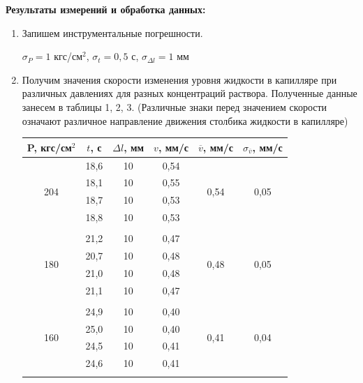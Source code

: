 \documentclass[a4paper, 12pt]{article}%
\begin{document}
	
    \textbf{Результаты измерений и обработка данных: }
	
	\begin{enumerate}
		\item Запишем инструментальные погрешности.
		
		$\sigma_P = 1$ кгс/см$^2$, 
		$\sigma_t = 0,5$ с, 
		$\sigma_{\Delta l} = 1$ мм
		
		\item  Получим значения скорости изменения уровня жидкости в капилляре при различных давлениях для разных концентраций раствора. Полученные данные занесем в таблицы 1, 2, 3. (Различные знаки перед значением скорости означают различное направление движения столбика жидкости в капилляре)
	\newpage
		\begin{longtable} {|c|c|c|c|c|c|}
		\hline
		P, кгс/см$^2$ & $ t $, с &   $ \Delta l$, мм  & $v$,  мм/с   & $\overline v $, мм/с & $\sigma_{\overline v}$, мм/с\\ \hline
		 \multirow{4}{*}{204}& 18,6 & 10 & 0,54 &  \multirow{4}{*}{0,54}    & \multirow{4}{*}{0,05}\\ \cline{2-4}
		 & 18,1 & 10 &    0,55         &               &\\ \cline{2-4}
		 & 18,7 & 10 &     0,53         &              & \\ \cline{2-4}
		 & 18,8 & 10 &    0,53           &             &\\ \hline
		 &&&&&\\ \hline
		 
		  \multirow{4}{*}{180}& 21,2 & 10 & 0,47 &  \multirow{4}{*}{0,48}    & \multirow{4}{*}{0,05}\\ \cline{2-4}
		 & 20,7 & 10 &    0,48         &               &\\ \cline{2-4}
		 & 21,0 & 10 &     0,48         &              & \\ \cline{2-4}
		 & 21,1 & 10 &    0,47           &             &\\ \hline
		 &&&&&\\ \hline
		 
		  \multirow{4}{*}{160}& 24,9 & 10 & 0,40 &  \multirow{4}{*}{0,41}    & \multirow{4}{*}{0,04}\\ \cline{2-4}
		 & 25,0 & 10 &    0,40         &               &\\ \cline{2-4}
		 & 24,5 & 10 &     0,41         &              & \\ \cline{2-4}
		 & 24,6 & 10 &    0,41           &             &\\ \hline
		 &&&&&\\ \hline
		 

\end{longtable}
\end{enumerate}
\end{document}
